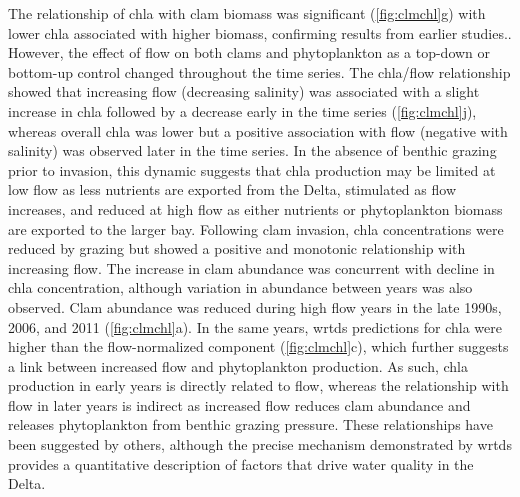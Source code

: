 \documentclass[journal = esthag, manuscript = article]{achemso}\usepackage[]{graphicx}\usepackage[]{color}
\begin{document}
The relationship of \ac{chla} with clam biomass was significant (\cref{fig:clmchl}g) with lower \ac{chla} associated with higher biomass, confirming results from earlier studies.\cite{Alpine92,Thompson08}.  However, the effect of flow on both clams and phytoplankton as a top-down or bottom-up control changed throughout the time series.  The \ac{chla}/flow relationship showed that increasing flow (decreasing salinity) was associated with a slight increase in \ac{chla} followed by a decrease early in the time series (\cref{fig:clmchl}j), whereas overall \ac{chla} was lower but a positive association with flow (negative with salinity) was observed later in the time series. In the absence of benthic grazing prior to invasion, this dynamic suggests that \ac{chla} production may be limited at low flow as less nutrients are exported from the Delta, stimulated as flow increases, and reduced at high flow as either nutrients or phytoplankton biomass are exported to the larger bay. Following clam invasion, \ac{chla} concentrations were reduced by grazing but showed a positive and monotonic relationship with increasing flow. The increase in clam abundance was concurrent with decline in \ac{chla} concentration, although variation in abundance between years was also observed.  Clam abundance was reduced during high flow years in the late 1990s, 2006, and 2011 (\ref{fig:clmchl}a). In the same years, \ac{wrtds} predictions for \ac{chla} were higher than the flow-normalized component (\cref{fig:clmchl}c), which further suggests a link between increased flow and phytoplankton production.  As such, \ac{chla} production in early years is directly related to flow, whereas the relationship with flow in later years is indirect as increased flow reduces clam abundance and releases phytoplankton from benthic grazing pressure. These relationships have been suggested by others\cite{Alpine92,Parchaso02,Jassby08}, although the precise mechanism demonstrated by \ac{wrtds} provides a quantitative description of factors that drive water quality in the Delta.
\end{document}
